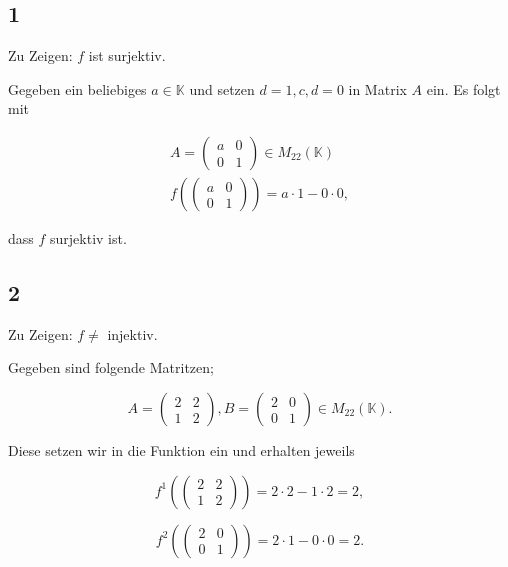 \documentclass[12pt]{article}
\newcommand{\K}{\mathbb{K}}
\begin{document}
\subsection*{1}
Zu Zeigen: $f$ ist surjektiv.

Gegeben ein beliebiges $a \in \K$ und setzen $d = 1, c, d = 0$ in Matrix $A$ ein. Es folgt mit

\begin{eqnarray*}
A = \left( 
    \begin{array}{ll} 
    a & 0 \\
    0 & 1
    \end{array} \right) \in M_{22}(\K) \\
f(
\left(
\begin{array}{ll}
a & 0 \\
0 & 1
\end{array}
\right)
) = a \cdot 1 - 0 \cdot 0,
\end{eqnarray*}

dass $f$ surjektiv ist.

\subsection*{2}
Zu Zeigen: $f \not=$ injektiv.

Gegeben sind folgende Matritzen;

\begin{equation*}
A = \left( 
    \begin{array}{ll} 
    2 & 2 \\
    1 & 2
    \end{array} \right), B = \left( 
    \begin{array}{ll} 
    2 & 0 \\
    0 & 1
    \end{array} \right) \in M_{22}(\K).
\end{equation*}

Diese setzen wir in die Funktion ein und erhalten jeweils

\begin{equation*}
f^1( \left( 
    \begin{array}{ll} 
    2 & 2 \\
    1 & 2
    \end{array} \right) ) = 2 \cdot 2 - 1 \cdot 2 = 2,  
\end{equation*}


\begin{equation*}
f^2( \left ( 
    \begin{array}{ll} 
    2 & 0 \\
    0 & 1
    \end{array} \right) ) = 2 \cdot 1 - 0 \cdot 0 = 2.
\end{equation*}
\end{document}
